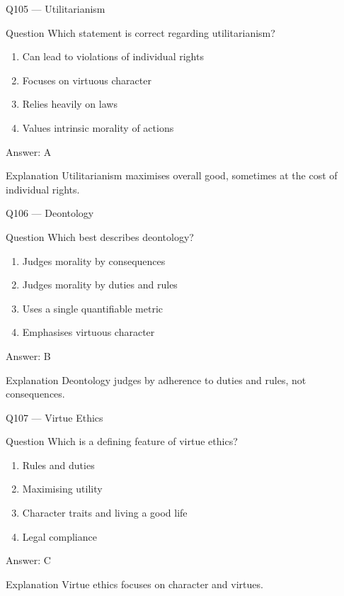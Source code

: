 \documentclass[aspectratio=169,8pt]{beamer}
\begin{document}
	\begin{frame}{Q105 --- Utilitarianism}
		\begin{block}{Question}
			Which statement is correct regarding utilitarianism?
		\end{block}
		\begin{enumerate}
			\item Can lead to violations of individual rights
			\item Focuses on virtuous character
			\item Relies heavily on laws
			\item Values intrinsic morality of actions
		\end{enumerate}
		\begin{exampleblock}{Answer: A}\end{exampleblock}
		\begin{block}{Explanation}
			Utilitarianism maximises overall good, sometimes at the cost of individual rights.
		\end{block}
	\end{frame}
	
	\begin{frame}{Q106 --- Deontology}
		\begin{block}{Question}
			Which best describes deontology?
		\end{block}
		\begin{enumerate}
			\item Judges morality by consequences
			\item Judges morality by duties and rules
			\item Uses a single quantifiable metric
			\item Emphasises virtuous character
		\end{enumerate}
		\begin{exampleblock}{Answer: B}\end{exampleblock}
		\begin{block}{Explanation}
			Deontology judges by adherence to duties and rules, not consequences.
		\end{block}
	\end{frame}
	
	\begin{frame}{Q107 --- Virtue Ethics}
		\begin{block}{Question}
			Which is a defining feature of virtue ethics?
		\end{block}
		\begin{enumerate}
			\item Rules and duties
			\item Maximising utility
			\item Character traits and living a good life
			\item Legal compliance
		\end{enumerate}
		\begin{exampleblock}{Answer: C}\end{exampleblock}
		\begin{block}{Explanation}
			Virtue ethics focuses on character and virtues.
		\end{block}
	\end{frame}
	
\end{document}
